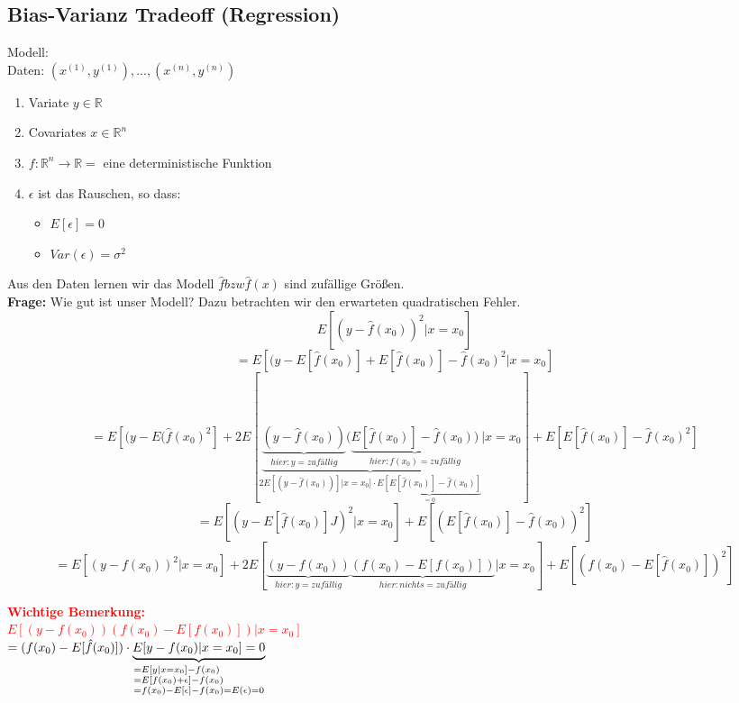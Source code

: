\subsection{Bias-Varianz Tradeoff (Regression)}
Modell: \\
Daten: $(x^{(1)},y^{(1)}),...,(x^{(n)},y^{(n)})$\\
\begin{enumerate}
\item Variate   $y \in \mathbb{R}$
\item Covariates    $x \in \mathbb{R}^n$
\item $f: \mathbb{R}^n \rightarrow \mathbb{R} =$ eine deterministische Funktion
\item $\epsilon$ ist das Rauschen, so dass:
\begin{itemize}
\item $E[\epsilon] = 0$
\item $Var(\epsilon) = \sigma^2$
\end{itemize}
\end{enumerate}
Aus den Daten lernen wir das Modell $\hat{f} bzw \hat{f}(x)$ sind zufällige Größen.\\
\textbf{Frage:} Wie gut ist unser Modell? Dazu betrachten wir den erwarteten quadratischen Fehler.
$$E[(y-\hat{f}(x_0))^2 | x = x_0] $$
$$= E[(y-E[\hat{f}(x_0)] + E[\hat{f}(x_0)] - \hat{f}(x_0)^2 | x = x_0] $$
$$= E[(y-E(\hat{f}(x_0)^2] + 2E[
\underbrace{
\underbrace{(y-\hat{f}(x_0))}_{hier: y = zufällig}(\underbrace{E[\hat{f}(x_0)]-\hat{f}(x_0))}_{hier: f(x_0) = zufällig}}_{2E[(y-\hat{f}(x_0))] | x = x_0] \cdot \underbrace{E[E[\hat{f}(x_0)]-\hat{f}(x_0)]}_{=0}} | x = x_0] + E[E[\hat{f}(x_0)]-\hat{f}(x_0)^2]$$
$$= E[(y-E[\hat{f}(x_0)]J)^2  | x = x_0] + E[(E[\hat{f}(x_0)] - \hat{f}(x_0))^2]$$
$$= E[(y-f(x_0))^2 | x=x_0] + 2E[\underbrace{(y-f(x_0))}_{hier: y = zufällig}\underbrace{(f(x_0)-E[f(x_0)])}_{hier: nichts = zufällig} | x = x_0] +  E[(f(x_0)-E[\hat{f}(x_0)])^2]$$

\textcolor{red}{
\textbf{Wichtige Bemerkung:}\\
$E[(y-f(x_0))(f(x_0) - E[f(x_0)]) | x = x_0]$\\
$= (f(x_0) - E[\hat{f}(x_0)]) \cdot \underbrace{E[y - f(x_0) | x = x_0] = 0}_{
\begin{subarray}{l} 
=E[y | x = x_0] - f(x_0)\\
= E[f(x_0) + \epsilon] - f(x_0)\\
=f(x_0) - E[\epsilon] - f(x_0) = E(\epsilon) = 0
\end{subarray}
} $
}

